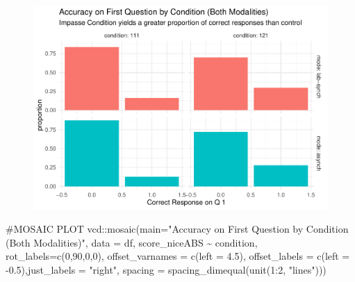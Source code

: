 \documentclass[
  letterpaper,
  DIV=11,
  numbers=noendperiod]{scrreprt}
\newenvironment{Shaded}{\begin{snugshade}}{\end{snugshade}}
\newcommand{\AttributeTok}[1]{\textcolor[rgb]{0.40,0.45,0.13}{#1}}
\newcommand{\CommentTok}[1]{\textcolor[rgb]{0.37,0.37,0.37}{#1}}
\newcommand{\DecValTok}[1]{\textcolor[rgb]{0.68,0.00,0.00}{#1}}
\newcommand{\FloatTok}[1]{\textcolor[rgb]{0.68,0.00,0.00}{#1}}
\newcommand{\FunctionTok}[1]{\textcolor[rgb]{0.28,0.35,0.67}{#1}}
\newcommand{\NormalTok}[1]{\textcolor[rgb]{0.00,0.23,0.31}{#1}}
\newcommand{\SpecialCharTok}[1]{\textcolor[rgb]{0.37,0.37,0.37}{#1}}
\newcommand{\StringTok}[1]{\textcolor[rgb]{0.13,0.47,0.30}{#1}}
\begin{document}
\begin{figure}[H]

{\centering \includegraphics{analysis/SGC3A/5_sgc3A_exploration_files/figure-pdf/VIS-LR-Q1.tri.by.Cond-1.pdf}

}

\end{figure}

\begin{Shaded}
\begin{Highlighting}[]
\CommentTok{\#MOSAIC PLOT}
\NormalTok{vcd}\SpecialCharTok{::}\FunctionTok{mosaic}\NormalTok{(}\AttributeTok{main=}\StringTok{"Accuracy on First Question by Condition (Both Modalities)"}\NormalTok{,}
            \AttributeTok{data =}\NormalTok{ df, score\_niceABS }\SpecialCharTok{\textasciitilde{}}\NormalTok{ condition, }\AttributeTok{rot\_labels=}\FunctionTok{c}\NormalTok{(}\DecValTok{0}\NormalTok{,}\DecValTok{90}\NormalTok{,}\DecValTok{0}\NormalTok{,}\DecValTok{0}\NormalTok{),}
            \AttributeTok{offset\_varnames =} \FunctionTok{c}\NormalTok{(}\AttributeTok{left =} \FloatTok{4.5}\NormalTok{), }\AttributeTok{offset\_labels =} \FunctionTok{c}\NormalTok{(}\AttributeTok{left =} \SpecialCharTok{{-}}\FloatTok{0.5}\NormalTok{),}\AttributeTok{just\_labels =} \StringTok{"right"}\NormalTok{,}
            \AttributeTok{spacing =} \FunctionTok{spacing\_dimequal}\NormalTok{(}\FunctionTok{unit}\NormalTok{(}\DecValTok{1}\SpecialCharTok{:}\DecValTok{2}\NormalTok{, }\StringTok{"lines"}\NormalTok{)))}
\end{Highlighting}
\end{Shaded}
\end{document}
